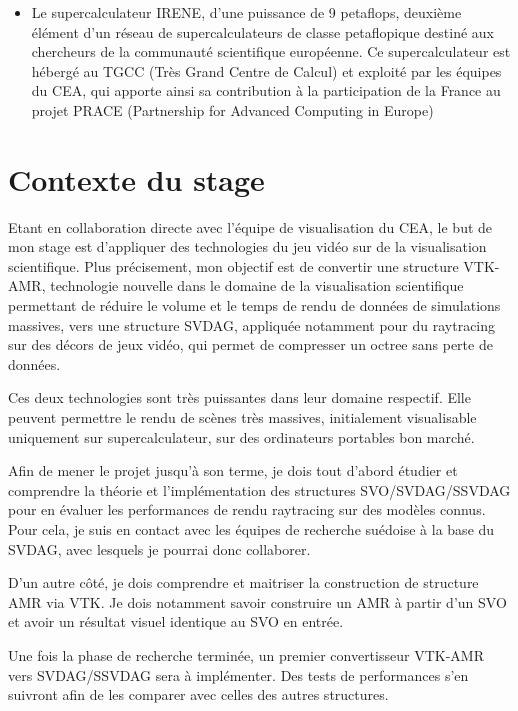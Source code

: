 \documentclass[12pt,a4paper,twoside]{article}
\begin{document}
\begin{itemize}[label=\textbullet]
        \item
        Le supercalculateur IRENE, d’une puissance de 9 petaflops, deuxième élément d’un réseau de supercalculateurs de classe petaflopique destiné aux chercheurs de la communauté scientifique européenne. Ce supercalculateur est hébergé au TGCC (Très Grand Centre de Calcul) et exploité par les équipes du CEA, qui apporte ainsi sa contribution à la participation de la France au projet PRACE (Partnership for Advanced Computing in Europe)

    \end{itemize}



    \newpage


    \newpage
    \section{Contexte du stage}                 %

    Etant en collaboration directe avec l'équipe de visualisation du CEA, le but de mon stage est d'appliquer
    des technologies du jeu vidéo sur de la visualisation scientifique. Plus précisement, mon objectif est de convertir
    une structure VTK-AMR, technologie nouvelle dans le domaine de la visualisation scientifique permettant de réduire
    le volume et le temps de rendu de données de simulations massives, vers une structure SVDAG, appliquée notamment pour
    du raytracing sur des décors de jeux vidéo, qui permet de compresser un octree sans perte de données.

    Ces deux technologies sont très puissantes dans leur domaine respectif. Elle peuvent permettre le rendu de scènes
    très massives, initialement visualisable uniquement sur supercalculateur, sur des ordinateurs portables bon marché.

    Afin de mener le projet jusqu'à son terme, je dois tout d'abord étudier et comprendre la théorie et l'implémentation des structures
    SVO/SVDAG/SSVDAG pour en évaluer les performances de rendu raytracing sur des modèles connus. Pour cela, je suis en contact
    avec les équipes de recherche suédoise à la base du SVDAG, avec lesquels je pourrai donc collaborer.

    D'un autre côté, je dois comprendre et maitriser la construction de structure AMR via VTK. Je dois notamment
    savoir construire un AMR à partir d'un SVO et avoir un résultat visuel identique au SVO en entrée.

    Une fois la phase de recherche terminée, un premier convertisseur VTK-AMR vers SVDAG/SSVDAG sera à
    implémenter. Des tests de performances s'en suivront afin de les comparer avec celles des autres structures.
\end{document}
